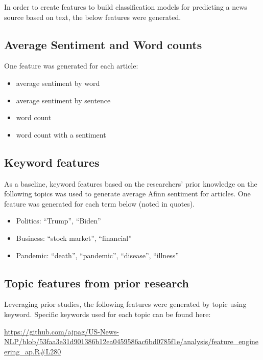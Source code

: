 \documentclass[
]{article}
\providecommand{\tightlist}{%
  \setlength{\itemsep}{0pt}\setlength{\parskip}{0pt}}
\begin{document}
In order to create features to build classification models for
predicting a news source based on text, the below features were
generated.

\hypertarget{average-sentiment-and-word-counts}{%
\subsection{Average Sentiment and Word
counts}\label{average-sentiment-and-word-counts}}

One feature was generated for each article:

\begin{itemize}
\tightlist
\item
  average sentiment by word
\item
  average sentiment by sentence
\item
  word count
\item
  word count with a sentiment
\end{itemize}

\hypertarget{keyword-features}{%
\subsection{Keyword features}\label{keyword-features}}

As a baseline, keyword features based on the researchers' prior
knowledge on the following topics was used to generate average Afinn
sentiment for articles. One feature was generated for each term below
(noted in quotes).

\begin{itemize}
\item
  Politics: ``Trump'', ``Biden''
\item
  Business: ``stock market'', ``financial''
\item
  Pandemic: ``death'', ``pandemic'', ``disease'', ``illness''
\end{itemize}

\hypertarget{topic-features-from-prior-research}{%
\subsection{Topic features from prior
research}\label{topic-features-from-prior-research}}

Leveraging prior studies, the following features were generated by topic
using keyword. Specific keywords used for each topic can be found here:

\url{https://github.com/ajpag/US-News-NLP/blob/53faa3e31d901386b12ea0459586ac6bd0785f1e/analysis/feature_engineering_ap.R\#L280}
\end{document}
